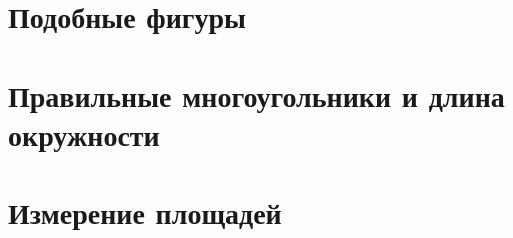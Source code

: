 \documentclass[twoside]{book}
\begin{document}
\chapter{Подобные фигуры}








\chapter[Правильные многоугольники]{Правильные многоугольники и длина окружности}



\chapter{Измерение площадей}





{\scriptsize
\printindex
}



\tableofcontents

\end{document}
